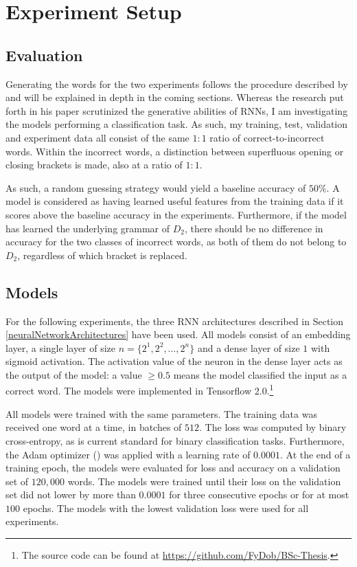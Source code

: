 \section{Experiment Setup}\label{ch:experimentSetup}
\subsection{Evaluation}\label{evaluation}
Generating the words for the two experiments follows the procedure described by \cite{Bernardy2018} and will be explained in depth in the coming sections. Whereas the research put forth in his paper scrutinized the generative abilities of RNNs, I am investigating the models performing a classification task. As such, my training, test, validation and experiment data all consist of the same $1{:}1$ ratio of correct-to-incorrect words. Within the incorrect words, a distinction between superfluous opening or closing brackets is made, also at a ratio of $1{:}1$.

As such, a random guessing strategy would yield a baseline accuracy of $50\%$. A model is considered as having learned useful features from the training data if it scores above the baseline accuracy in the experiments. Furthermore, if the model has learned the underlying grammar of $D_{2}$, there should be no difference in accuracy for the two classes of incorrect words, as both of them do not belong to $D_{2}$, regardless of which bracket is replaced.

\subsection{Models}\label{models}
For the following experiments, the three RNN architectures described in Section \ref{neuralNetworkArchitectures} have been used. All models consist of an embedding layer, a single layer of size $n = \lbrace 2^{1}, 2^{2}, \dots, 2^{n} \rbrace$ and a dense layer of size $1$ with sigmoid activation. The activation value of the neuron in the dense layer acts as the output of the model: a value $\geq 0.5$ means the model classified the input as a correct word. The models were implemented in Tensorflow 2.0.\footnote{The source code can be found at \url {https://github.com/FyDob/BSc-Thesis}.}

All models were trained with the same parameters. The training data was received one word at a time, in batches of $512$. The loss was computed by binary cross-entropy, as is current standard for binary classification tasks. Furthermore, the Adam optimizer (\cite{Kingma2014}) was applied with a learning rate of $0.0001$. At the end of a training epoch, the models were evaluated for loss and accuracy on a validation set of $120{,}000$ words. The models were trained until their loss on the validation set did not lower by more than $0.0001$ for three consecutive epochs or for at most $100$ epochs. The models with the lowest validation loss were used for all experiments.


